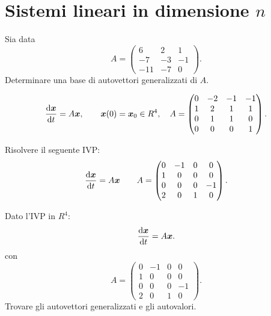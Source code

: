 \section{Sistemi lineari in dimensione $n$}%
\begin{ex}
Sia data 
\[
    A = 
    \begin{pmatrix} 
	6 & 2 & 1 \\
	- 7 & -3 & -1 \\
	-11 & -7 & 0 
    \end{pmatrix} 
.\] 	
Determinare una base di autovettori generalizzati di $A$.
\end{ex}
\noindent
\begin{ex}
\[
    \frac{\text{d} \boldsymbol{x}}{\text{d} t} = A \boldsymbol{x}, \qquad \boldsymbol{x}(0) = \boldsymbol{x}_0 \in R^4, \quad A = 
    \begin{pmatrix} 
	0 & -2 & -1 & -1 \\
	1 & 2 & 1 & 1 \\
	0 & 1 & 1 & 0 \\
	0 & 0 & 0 & 1
    \end{pmatrix} 
.\] 	
\end{ex}
\noindent
 
\begin{ex}
Risolvere il seguente IVP:
\[
    \frac{\text{d} \boldsymbol{x}}{\text{d} t} = A \boldsymbol{x} \qquad A = 
    \begin{pmatrix}   
	0 & -1 & 0 & 0 \\
	1 & 0 & 0 & 0 \\
	0 & 0 & 0 & -1 	\\
	2 & 0 & 1 & 0 
    \end{pmatrix} 
.\] 
\end{ex}
\noindent

\begin{ex}
Dato l'IVP in $R^4$:
\[
    \frac{\text{d} \boldsymbol{x}}{\text{d} t} = A \boldsymbol{x}
.\] 
con 
\[
    A = 
    \begin{pmatrix}
	0 & -1 & 0 & 0\\
	1 & 0 & 0 & 0 \\
	0 & 0 & 0 & -1\\
	2 & 0 & 1 & 0
    \end{pmatrix} 
.\] 
Trovare gli autovettori generalizzati e gli autovalori.
\end{ex}
\noindent
